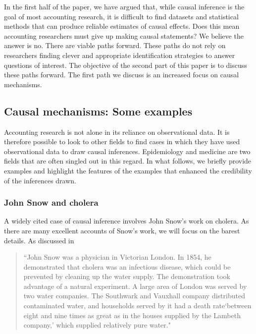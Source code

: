 \documentclass[12pt,reqno,titlepage]{amsart}
\begin{document}
\begin{doublespace}
In the first half of the paper, we have argued that, while causal inference is the goal of most accounting research, it is difficult to find datasets and statistical methods that can produce reliable estimates of causal effects.
Does this mean accounting researchers must give up making causal statements? 
We believe the answer is no. 
There are viable paths forward. 
These paths do not rely on researchers finding clever and appropriate identification strategies to answer questions of interest.
The objective of the second part of this paper is to discuss these paths forward.
The first path we discuss is an increased focus on causal mechanisms.

\subsection{Causal mechanisms: Some examples}
Accounting research is not alone in its reliance on observational data. It is therefore possible to look to other fields to find cases
in which they have used observational data to draw causal inferences.
Epidemiology and medicine are two fields that are often singled out in this regard.
In what follows, we briefly provide examples and highlight the features of the examples that enhanced the credibility of the inferences drawn.

\subsubsection{John Snow and cholera}
A widely cited case of causal inference involves John Snow's work on cholera.
As there are many excellent accounts of Snow's work, we will focus on the barest details.
As discussed in  \citet[p.\,339]{Freedman:2009ur}

\vglue 5pt
\begin{quote}\begin{singlespace} 
``John Snow was a physician in Victorian London.
 In 1854, he demonstrated that cholera was an infectious disease, which could be prevented by cleaning up the water supply. 
The demonstration took advantage of a natural experiment.
 A large area of London was served by two water companies. 
 The Southwark and Vauxhall company distributed contaminated water, and households served by it had a death rate`between eight and nine times as great as in the houses supplied by the Lambeth company,' which supplied relatively pure water."\end{singlespace} 
\end{quote}



\end{doublespace}
\end{document}
